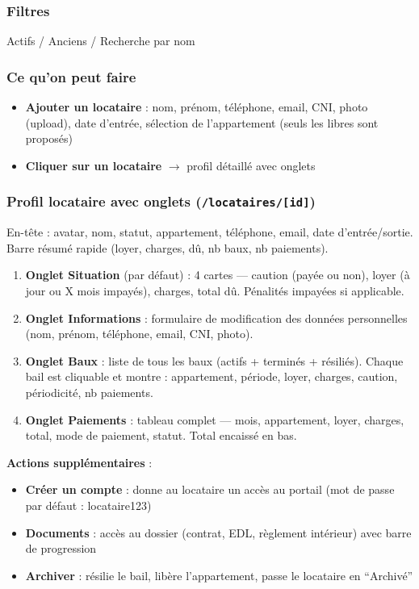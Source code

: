 \documentclass[12pt,a4paper]{article}
\begin{document}
\subsubsection{Filtres}
Actifs / Anciens / Recherche par nom

\subsubsection{Ce qu'on peut faire}
\begin{itemize}
\item \textbf{Ajouter un locataire} : nom, pr\'enom, t\'el\'ephone, email, CNI, photo (upload), date d'entr\'ee, s\'election de l'appartement (seuls les libres sont propos\'es)
\item \textbf{Cliquer sur un locataire} $\rightarrow$ profil d\'etaill\'e avec onglets
\end{itemize}

\subsubsection{Profil locataire avec onglets (\texttt{/locataires/[id]})}

En-t\^ete : avatar, nom, statut, appartement, t\'el\'ephone, email, date d'entr\'ee/sortie. Barre r\'esum\'e rapide (loyer, charges, d\^u, nb baux, nb paiements).

\begin{enumerate}
\item \textbf{Onglet Situation} (par d\'efaut) : 4 cartes --- caution (pay\'ee ou non), loyer (\`a jour ou X mois impay\'es), charges, total d\^u. P\'enalit\'es impay\'ees si applicable.

\item \textbf{Onglet Informations} : formulaire de modification des donn\'ees personnelles (nom, pr\'enom, t\'el\'ephone, email, CNI, photo).

\item \textbf{Onglet Baux} : liste de tous les baux (actifs + termin\'es + r\'esili\'es). Chaque bail est cliquable et montre : appartement, p\'eriode, loyer, charges, caution, p\'eriodicit\'e, nb paiements.

\item \textbf{Onglet Paiements} : tableau complet --- mois, appartement, loyer, charges, total, mode de paiement, statut. Total encaiss\'e en bas.
\end{enumerate}

\textbf{Actions suppl\'ementaires} :
\begin{itemize}
\item \textbf{Cr\'eer un compte} : donne au locataire un acc\`es au portail (mot de passe par d\'efaut : locataire123)
\item \textbf{Documents} : acc\`es au dossier (contrat, EDL, r\`eglement int\'erieur) avec barre de progression
\item \textbf{Archiver} : r\'esilie le bail, lib\`ere l'appartement, passe le locataire en ``Archiv\'e''
\end{itemize}
\end{document}
